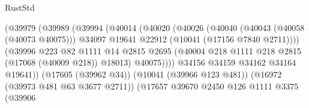 \begin{lexlean}{RustStd}
\begin{coremodule}
                                            (@39979
                                              (@39989
                                                (@39994
                                                  (@40014
                                                    (@40020
                                                      (@40026
                                                        (@40040
                                                          (@40043 (@40058 (@40073 @40075)))
                                                          @34097
                                                          @19641
                                                          @22912
                                                          (@10041 (@17156 @7840 @2711))))
                                                      (@39996
                                                        @223
                                                        @82
                                                        @1111
                                                        @14
                                                        @2815
                                                        @2695
                                                        (@40004
                                                          @218
                                                          @1111
                                                          @218
                                                          @2815
                                                          (@17068 (@40009 @218))
                                                          @18013)
                                                        @40075))))
                                                @34156
                                                @34159
                                                @34162
                                                @34164
                                                @19641))
                                            (@17605 (@39962 @34))
                                            (@10041 (@39966 @123 @481))
                                            (@16972 (@39973 @481 @63 @3677 @2711))
                                            (@17657
                                              @39670
                                              @2450
                                              @126
                                              @1111
                                              @3375
                                              (@39906

\end{coremodule}
\end{lexlean}
